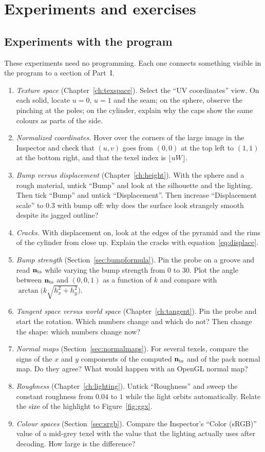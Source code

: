 \chapter{Experiments and exercises}
\label{ch:exercises}

\section{Experiments with the program}
These experiments need no programming. Each one connects something visible in the program to a
section of Part~I.

\begin{enumerate}[label=\textbf{E\arabic*.}]
\item \emph{Texture space} (Chapter~\ref{ch:texspace}). Select the ``UV coordinates'' view. On each
solid, locate $u=0$, $u=1$ and the seam; on the sphere, observe the pinching at the poles; on the
cylinder, explain why the caps show the same colours as parts of the side.
\item \emph{Normalized coordinates.} Hover over the corners of the large image in the Inspector and
check that $(u,v)$ goes from $(0,0)$ at the top left to $(1,1)$ at the bottom right, and that the
texel index is $\lfloor uW\rfloor$.
\item \emph{Bump versus displacement} (Chapter~\ref{ch:height}). With the sphere and a rough
material, untick ``Bump'' and look at the silhouette and the lighting. Then tick ``Bump'' and
untick ``Displacement''. Then increase ``Displacement scale'' to $0.3$ with bump off: why does the
surface look strangely smooth despite its jagged outline?
\item \emph{Cracks.} With displacement on, look at the edges of the pyramid and the rims of the
cylinder from close up. Explain the cracks with equation~\eqref{eq:displace}.
\item \emph{Bump strength} (Section~\ref{sec:bumpformula}). Pin the probe on a groove and read
$\mathbf{n}_{\mathrm{ts}}$ while varying the bump strength from $0$ to $30$. Plot the angle between $\mathbf{n}_{\mathrm{ts}}$ and
$(0,0,1)$ as a function of $k$ and compare with $\arctan\bigl(k\sqrt{h_x^2+h_y^2}\bigr)$.
\item \emph{Tangent space versus world space} (Chapter~\ref{ch:tangent}). Pin the probe and start
the rotation. Which numbers change and which do not? Then change the shape: which numbers change
now?
\item \emph{Normal maps} (Section~\ref{sec:normalmaps}). For several texels, compare the signs of
the $x$ and $y$ components of the computed $\mathbf{n}_{\mathrm{ts}}$ and of the pack normal map. Do they agree? What
would happen with an OpenGL normal map?
\item \emph{Roughness} (Chapter~\ref{ch:lighting}). Untick ``Roughness'' and sweep the constant
roughness from $0.04$ to $1$ while the light orbits automatically. Relate the size of the
highlight to Figure~\ref{fig:ggx}.
\item \emph{Colour spaces} (Section~\ref{sec:srgb}). Compare the Inspector's ``Color (sRGB)'' value
of a mid-grey texel with the value that the lighting actually uses after decoding. How large is
the difference?
\end{enumerate}


